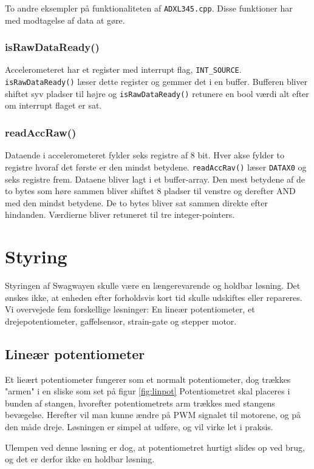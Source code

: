 \documentclass[a4paper,11pt,oneside,article,danish,table]{memoir}
\newcommand{\adxlc}[2]{}
\begin{document}
To andre eksempler på funktionaliteten af \texttt{ADXL345.cpp}. Disse funktioner har med modtagelse af data at gøre.

\subsubsection{isRawDataReady()}
\adxlc{75}{79}
Accelerometeret har et register med interrupt flag, \lstinline{INT_SOURCE}. \lstinline{isRawDataReady()} læser dette register og gemmer det i en buffer. Bufferen bliver shiftet syv pladser til højre og  \lstinline{isRawDataReady()} retunere en bool værdi alt efter om interrupt flaget er sat.

\subsubsection{readAccRaw()}
\adxlc{99}{105}
Dataende i accelerometeret fylder seks registre af 8 bit. Hver akse fylder to registre hvoraf det første er den mindst betydene. \lstinline{readAccRav()} læser \lstinline{DATAX0} og seks registre frem. Dataene bliver lagt i et buffer-array. Den mest betydene af de to bytes som høre sammen bliver shiftet 8 pladser til venstre og derefter AND med den mindst betydene. De to bytes bliver sat sammen direkte efter hindanden. Værdierne bliver retuneret til tre integer-pointers.

\section{Styring}
Styringen af Swagwayen skulle være en længerevarende og holdbar løsning. Det ønskes ikke, at enheden efter forholdsvis kort tid skulle udskiftes eller repareres. Vi overvejede fem forskellige løsninger: En lineær potentiometer, et drejepotentiometer, gaffelsensor, strain-gate og stepper motor.
\subsection{Lineær potentiometer} 
Et lieært potentiometer fungerer som et normalt potentiometer, dog trækkes "armen" i en sliske som set på figur \ref{fig:linpot}
Potentiometret skal placeres i bunden af stangen, hvorefter potentiometrets arm trækkes med stangens bevægelse. Herefter vil man kunne ændre på PWM signalet til motorene, og på den måde dreje. Løsningen er simpel at udføre, og vil virke let i praksis.

Ulempen ved denne løsning er dog, at potentiometret hurtigt slides op ved brug, og det er derfor ikke en holdbar løsning. 
\end{document}

